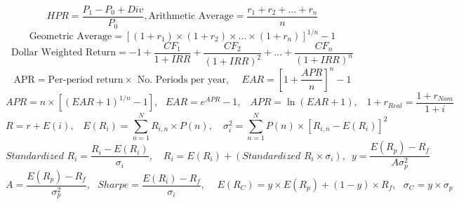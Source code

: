 $$HPR = \frac{P_{1} - P_{0}+Div}{P_{0}}, \textrm{Arithmetic Average} = \frac{r_{1}+r_{2}+\dots +r_{n}}{n}$$
$$\textrm{Geometric Average} = \left[ (1+r_{1})\times (1+r_{2}) \times \dots \times (1+r_{n})\right]^{1/n}-1$$
$$\textrm{Dollar Weighted Return} = -1 + \frac{CF_{1}}{1+IRR} + \frac{CF_{2}}{(1+IRR)^{2}} + \dots + \frac{CF_{n}}{(1+IRR)^{n}}$$
$$\textrm{APR} = \textrm{Per-period return} \times \textrm{ No. Periods per year}, \,\,\,\,\,\,\, EAR = \left[ 1 + \frac{APR}{n}\right]^{n}-1$$
$$ APR = n \times \left[ (EAR + 1)^{1/n} - 1 \right], \,\,\,\, EAR = e^{APR} - 1, \,\,\,\,\, APR = \ln (EAR + 1), \,\,\,\,\, 1+r_{Real} = \frac{1+r_{Nom}}{1+i}$$
$$R = r +E(i), \,\,\,\,\, E(R_{i}) = \sum_{n=1}^{N} R_{i,n}\times P(n), \,\,\,\,\,\, \sigma_{i}^{2} = \sum_{n=1}^{N} P(n)\times\left[R_{i,n} - E(R_{i})\right]^{2}$$
$$Standardized \,\, R_{i} = \frac{R_{i}-E(R_{i})}{\sigma_{i}}, \,\,\,\,\,\, R_{i} = E(R_{i}) + (Standardized \,\, R_{i} \times \sigma_{i}), \,\,\, y =  \frac{E(R_{p}) - R_{f}}{A\sigma^{2}_{p}}$$
$$ A = \frac{E(R_{p}) - R_{f}}{\sigma^{2}_{p}}, \,\,\,\, Sharpe = \frac{E(R_{i})-R_{f}}{\sigma_{i}}, \,\,\,\,\,\,\,  E(R_{C}) = y\times E(R_{p})+(1-y)\times R_{f}, \,\,\,\, \sigma_{C} = y \times \sigma_{p}$$